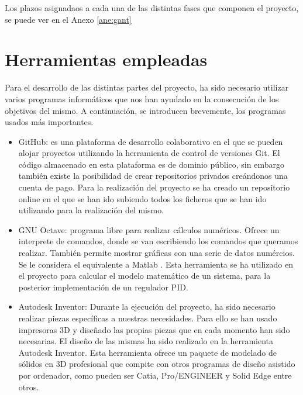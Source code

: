 Los plazos asignadaos a cada una de las distintas fases que componen el proyecto, se puede ver en el Anexo \ref{ane:gant}

\section{Herramientas empleadas}
\label{sec:herramientas}

Para el desarrollo de las distintas partes del proyecto, ha sido necesario utilizar varios programas informáticos que nos han ayudado en la consecución de los objetivos del mismo. A continuación, se introducen brevemente, los programas usados más importantes.
\begin{itemize}
\item{GitHub: es una plataforma de desarrollo colaborativo en el que se pueden alojar proyectos utilizando la herramienta de control de versiones Git. El código almacenado en esta plataforma es de dominio público, sin embargo también existe la posibilidad de crear repositorios privados creándonos una cuenta de pago. Para la realización del proyecto se ha creado un repositorio online \cite{githubTFG} en el que se han ido subiendo todos los ficheros que se han ido utilizando para la realización del mismo.}

\item{GNU Octave:  programa libre para realizar cálculos numéricos. Ofrece un interprete de comandos, donde se van escribiendo los comandos que queramos realizar. También permite mostrar gráficas con una serie de datos numércios. Se le considera el equivalente a Matlab \cite{octave}. Esta herramienta se ha utilizado en el proyecto para calcular el modelo matemático de un sistema, para la posterior implementación de un regulador PID.}

\item{Autodesk Inventor: 
Durante la ejecución del proyecto, ha sido necesario realizar piezas específicas a nuestras necesidades. Para ello se han usado impresoras 3D y diseñado las propias piezas que en cada momento han sido necesarias. El diseño de las mismas ha sido realizado en la herramienta Autodesk Inventor. Esta herramienta ofrece un paquete de modelado de sólidos en 3D profesional que compite con otros programas de diseño asistido por ordenador, como pueden ser Catia, Pro/ENGINEER y Solid Edge entre otros.

}
\end{itemize}
